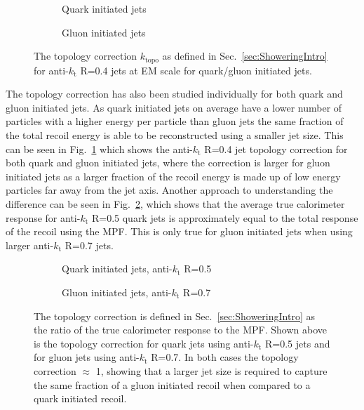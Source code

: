 \begin{figure}[!ht]
  \centering
  \begin{subfigure}{.5\textwidth}
    \centering
    \caption{Quark initiated jets}
  \end{subfigure}%
  \begin{subfigure}{.5\textwidth}  \centering
    \caption{Gluon initiated jets}
  \end{subfigure}
  \caption[Topology correction for quark/gluon initiated jets.]
{\small The topology correction $k_{\mathrm{topo}}$ as defined in Sec.~\ref{sec:ShoweringIntro} for anti-$k_\mathrm{t}$ R=0.4 jets at EM scale for quark/gluon initiated jets.  }
  \label{Fig:TopoCorr_QG4}
\end{figure}

The topology correction has also been studied individually for both quark and gluon initiated jets.
As quark initiated jets on average have a lower number of particles with a higher energy per particle than gluon jets the same fraction of the total recoil energy is able to be reconstructed using a smaller jet size.  
This can be seen in Fig.~\ref{Fig:TopoCorr_QG4} which shows the anti-$k_\mathrm{t}$ R=0.4 jet topology correction for both quark and gluon initiated jets, where the correction is larger for gluon initiated jets as a larger fraction of the recoil energy is made up of low energy particles far away from the jet axis.  
Another approach to understanding the difference can be seen in Fig.~\ref{Fig:TopoCorr_QGSizes}, which shows that the average true calorimeter response for anti-$k_\mathrm{t}$ R=0.5 quark jets is approximately equal to the total response of the recoil using the MPF.  
This is only true for gluon initiated jets when using larger anti-$k_\mathrm{t}$ R=0.7 jets.  

\begin{figure}[!ht]
  \centering
  \begin{subfigure}{.5\textwidth}
    \centering
    \caption{Quark initiated jets, anti-$k_\mathrm{t}$ R=0.5}
  \end{subfigure}%
  \begin{subfigure}{.5\textwidth}  \centering
    \caption{Gluon initiated jets, anti-$k_\mathrm{t}$ R=0.7}
  \end{subfigure}
  \caption[Topology correction for quark/gluon initiated jets.]
{\small The topology correction is defined in Sec.~\ref{sec:ShoweringIntro} as the ratio of the true calorimeter response to the MPF.  Shown above is the topology correction for quark jets using anti-$k_\mathrm{t}$ R=0.5 jets and for gluon jets using anti-$k_\mathrm{t}$ R=0.7.  In both cases the topology correction $\approx$ 1, showing that a larger jet size is required to capture the same fraction of a gluon initiated recoil when compared to a quark initiated recoil.  }
  \label{Fig:TopoCorr_QGSizes}
\end{figure}


